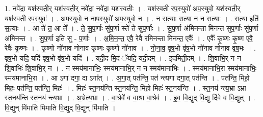 \documentclass[17pt]{extarticle}
\begin{document}
1. नवे॑दा॒ यश॑स्वती॒र् यश॑स्वती॒र् नवे॑दा॒ नवे॑दा॒ यश॑स्वतीः । . यश॑स्वती रप॒स्युवो॑ अप॒स्युवो॒ यश॑स्वती॒र् यश॑स्वती रप॒स्युवः॑ । . अ॒प॒स्युवो॒ न नाप॒स्युवो॑ अप॒स्युवो॒ न । . न स॒त्याः स॒त्या न न स॒त्याः । . स॒त्या इति॑ स॒त्याः । . आ ते॑ त॒ आ ते᳚ । . ते॒ सु॒प॒र्णाः सु॑प॒र्णा स्ते॑ ते सुप॒र्णाः । . सु॒प॒र्णा अ॑मिनन्ता मिनन्त सुप॒र्णाः सु॑प॒र्णा अ॑मिनन्त । . सु॒प॒र्णा इति॑ सु - प॒र्णाः । . अ॒मि॒न॒न्त॒ एवै॒ रेवै॑ रमिनन्ता मिनन्त॒ एवैः᳚ । . एवैः᳚ कृ॒ष्णः कृ॒ष्ण एवै॒ रेवैः᳚ कृ॒ष्णः । . कृ॒ष्णो नो॑नाव नोनाव कृ॒ष्णः कृ॒ष्णो नो॑नाव । . नो॒ना॒व॒ वृ॒ष॒भो वृ॑ष॒भो नो॑नाव नोनाव वृष॒भः । . वृ॒ष॒भो यदि॒ यदि॑ वृष॒भो वृ॑ष॒भो यदि॑ । . यदी॒द मि॒दं ॅयदि॒ यदी॒दम् । . इ॒दमिती॒दम् । . शि॒वाभि॒र् न न शि॒वाभिः॑ शि॒वाभि॒र् न । . न स्मय॑मानाभिः॒ स्मय॑मानाभि॒र् न न स्मय॑मानाभिः । . स्मय॑मानाभि॒रा स्मय॑मानाभिः॒ स्मय॑मानाभि॒रा । . आ ऽगा॑ दगा॒ दा ऽगा᳚त् । . अ॒गा॒त् पत॑न्ति॒ पत॑ न्त्यगा दगा॒त् पत॑न्ति । . पत॑न्ति॒ मिहो॒ मिहः॒ पत॑न्ति॒ पत॑न्ति॒ मिहः॑ । . मिहः॑ स्त॒नय॑न्ति स्त॒नय॑न्ति॒ मिहो॒ मिहः॑ स्त॒नय॑न्ति । . स्त॒नय॑ न्त्य॒भ्रा ऽभ्रा स्त॒नय॑न्ति स्त॒नय॑ न्त्य॒भ्रा । . अ॒भ्रेत्य॒भ्रा । . वा॒श्रेवे॑ व वा॒श्रा वा॒श्रेव॑ । . इ॒व॒ वि॒द्युद् वि॒द्यु दि॑वे व वि॒द्युत् । . वि॒द्युन् मि॑माति मिमाति वि॒द्युद् वि॒द्युन् मि॑माति । \newline
\end{document}
